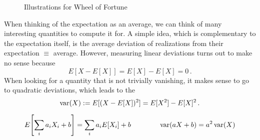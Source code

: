 \begin{figure}
\centering


%
\hspace{0.04\textwidth}
%

\caption{Illustrations for Wheel of Fortune}
\label{fig:wheel_of_fortune}
\end{figure}



When thinking of the expectation as an average, we can think of many interesting quantities to compute it for. A simple idea, which is complementary to the expectation itself, is the average deviation of realizations from their expectation $\equiv$ average. However, measuring linear deviations turns out to make no sense because
\begin{equation*}
E[X - E[X]] = E[X] - E[X] = 0 \, .
\end{equation*}
When looking for a quantity that is not trivially vanishing, it makes sense to go to quadratic deviations, which leads to the 
\begin{equation}
\operatorname{var}(X) := E[(X - E[X])^2] = E[X^2] - E[X]^2 \, .
\end{equation}


\begin{prop}
\begin{equation}
E\qty[\sum_i a_i X_i + b] = \sum_i a_i E[X_i] + b \qquad \qquad \operatorname{var}(a X + b) = a^2 \operatorname{var}(X)
\end{equation}
\end{prop}


